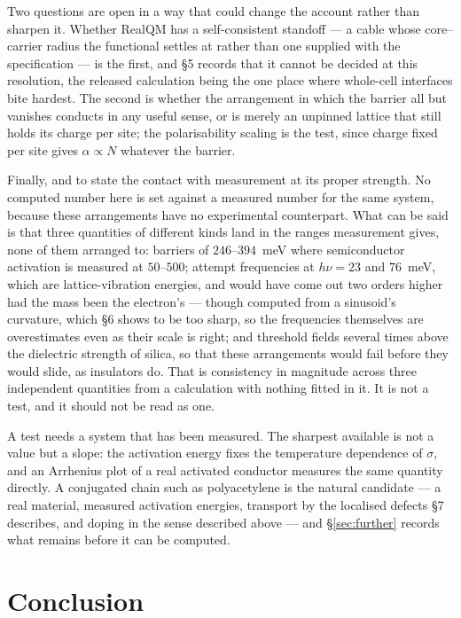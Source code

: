 \documentclass[11pt]{article}
\begin{document}
Two questions are open in a way that could change the account rather than sharpen it. Whether RealQM
has a self-consistent standoff --- a cable whose core--carrier radius the functional settles at
rather than one supplied with the specification --- is the first, and \S5 records that it cannot be
decided at this resolution, the released calculation being the one place where whole-cell interfaces
bite hardest. The
second is whether the arrangement in which the barrier all but vanishes conducts in any useful
sense, or is merely an unpinned lattice that still holds its charge per site; the polarisability
scaling is the test,
since charge fixed per site gives $\alpha\propto N$ whatever the barrier.

Finally, and to state the contact with measurement at its proper strength. No computed number here
is set against a measured number for the same system, because these arrangements have no
experimental counterpart. What can be said is that three quantities of different kinds land in the
ranges measurement gives, none of them arranged to: barriers of $246$--$394$~meV where semiconductor
activation is measured at $50$--$500$; attempt frequencies at $h\nu=23$ and $76$~meV, which are
lattice-vibration energies, and would have come out two orders higher had the mass been the
electron's --- though computed from a sinusoid's curvature, which \S6 shows to be too sharp, so the
frequencies themselves are overestimates even as their scale is right; and threshold fields several times above the dielectric strength of silica, so that these
arrangements would fail before they would slide, as insulators do. That is consistency in magnitude
across three independent quantities from a calculation with nothing fitted in it. It is not a test,
and it should not be read as one.

A test needs a system that has been measured. The sharpest available is not a value but a slope:
the activation energy fixes the temperature dependence of $\sigma$, and an Arrhenius plot of a real
activated conductor measures the same quantity directly. A conjugated chain such as polyacetylene is
the natural candidate --- a real material, measured activation energies, transport by the localised
defects \S7 describes, and doping in the sense described above --- and \S\ref{sec:further} records
what remains before it can be computed.

\section{Conclusion}
\end{document}
